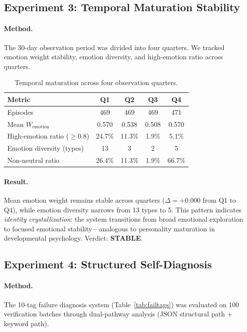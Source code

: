 \documentclass[11pt,a4paper]{article}
\begin{document}
\subsection{Experiment 3: Temporal Maturation Stability}

\paragraph{Method.} The 30-day observation period was divided into four quarters. We tracked emotion weight stability, emotion diversity, and high-emotion ratio across quarters.

\begin{table}[h]
\centering
\caption{Temporal maturation across four observation quarters.}
\label{tab:exp3}
\small
\begin{tabular}{@{}lcccc@{}}
\toprule
\textbf{Metric} & \textbf{Q1} & \textbf{Q2} & \textbf{Q3} & \textbf{Q4} \\
\midrule
Episodes & 469 & 469 & 469 & 471 \\
Mean $W_{\text{emotion}}$ & 0.570 & 0.538 & 0.508 & 0.570 \\
High-emotion ratio ($\geq 0.8$) & 24.7\% & 11.3\% & 1.9\% & 5.1\% \\
Emotion diversity (types) & 13 & 3 & 2 & 5 \\
Non-neutral ratio & 26.4\% & 11.3\% & 1.9\% & 66.7\% \\
\bottomrule
\end{tabular}
\end{table}

\paragraph{Result.} Mean emotion weight remains stable across quarters ($\Delta = +0.000$ from Q1 to Q4), while emotion diversity narrows from 13 types to 5. This pattern indicates \emph{identity crystallization}: the system transitions from broad emotional exploration to focused emotional stability---analogous to personality maturation in developmental psychology. Verdict: \textbf{STABLE}.

\subsection{Experiment 4: Structured Self-Diagnosis}

\paragraph{Method.} The 10-tag failure diagnosis system (Table~\ref{tab:failtags}) was evaluated on 100 verification batches through dual-pathway analysis (JSON structural path + keyword path).
\end{document}
